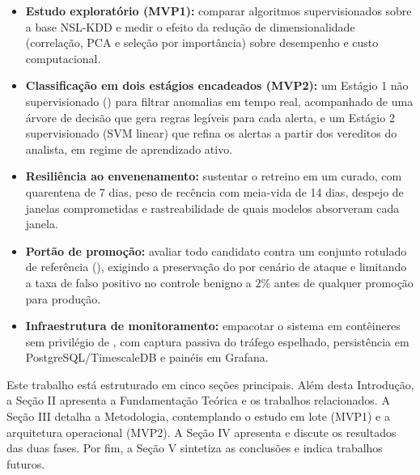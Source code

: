 \begin{itemize}
    \item \textbf{Estudo exploratório (MVP1):} comparar algoritmos supervisionados
    sobre a base NSL-KDD e medir o efeito da redução de dimensionalidade (correlação,
    PCA e seleção por importância) sobre desempenho e custo computacional.
    \item \textbf{Classificação em dois estágios encadeados (MVP2):} um Estágio 1
    não supervisionado () para filtrar anomalias em tempo real,
    acompanhado de uma árvore de decisão  que gera regras legíveis para
    cada alerta, e um Estágio 2 supervisionado (SVM linear) que refina os alertas a
    partir dos vereditos do analista, em regime de aprendizado ativo.
    \item \textbf{Resiliência ao envenenamento:} sustentar o retreino em um
     curado, com quarentena de 7 dias, peso de recência com meia-vida de
    14 dias, despejo de janelas comprometidas e rastreabilidade de quais modelos
    absorveram cada janela.
    \item \textbf{Portão de promoção:} avaliar todo candidato contra um conjunto
    rotulado de referência (), exigindo a preservação do 
    por cenário de ataque e limitando a taxa de falso positivo no controle benigno
    a 2\% antes de qualquer promoção para produção.
    \item \textbf{Infraestrutura de monitoramento:} empacotar o sistema em
    contêineres  sem privilégio de , com captura passiva do
    tráfego espelhado, persistência em PostgreSQL/TimescaleDB e painéis em Grafana.
\end{itemize}

Este trabalho está estruturado em cinco seções principais. Além desta Introdução,
a Seção II apresenta a Fundamentação Teórica e os trabalhos relacionados. A Seção III
detalha a Metodologia, contemplando o estudo em lote (MVP1) e a arquitetura
operacional (MVP2). A Seção IV apresenta e discute os resultados das duas fases.
Por fim, a Seção V sintetiza as conclusões e indica trabalhos futuros.
